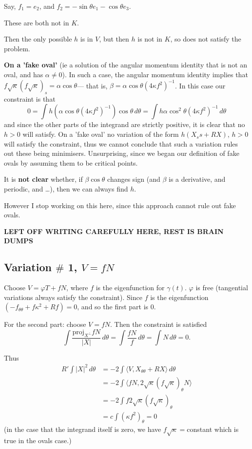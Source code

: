 \documentclass[12pt, a4paper]{amsart}
\theoremstyle{remark}
\begin{document}
Say, 
$f_1= e_2$, and 
$f_2=-\sin\theta e_1 -\cos\theta e_3$.

These are both not in $K$.     

Then the only possible $h$ is in $V$, but then $h$ is not in $K$, so does not satisfy the problem.

\textbf{On a 'fake oval'} (ie a solution of the angular momentum identity that is not an oval, and has $\alpha\not= 0$).    In such a case, the angular momentum identity implies that $f\sqrt\kappa(f\sqrt\kappa)_s=\alpha \cos\theta$--- that is, $\beta=\alpha\cos\theta(4\kappa f^2)^{-1}$.   In this case our constraint is that 
$$0=\int h \left(  \alpha\cos\theta(4\kappa f^2)^{-1}\right)\cos\theta \,d\theta= \int h  \alpha \cos^2\theta(4\kappa f^2)^{-1}\,d\theta $$
and since the other parts of the integrand are strictly positive, it is clear that no $h>0$ will satisfy.      On a 'fake oval' no variation of the form $h(X_ss +RX)$, $h>0$ will satisfy the constraint, thus we cannot conclude that such a variation rules out these being minimisers.      Unsurprising, since we began our definition of fake ovals by assuming them to be critical points.



 It is \textbf{not clear} whether, if $\beta\cos\theta$ changes sign (and $\beta$ is a derivative, and periodic, and \dots), then we can always find $h$.   
 
 However I stop working on this here, since this approach cannot rule out fake ovals.
 
 
 
 
 
  \textbf{LEFT OFF WRITING CAREFULLY HERE, REST IS BRAIN DUMPS}
  
 
  
\subsection*{ Variation $\#$ 1, $V=fN$}
Choose $V=\varphi T + f N$, where $f$ is the eigenfunction for $\gamma(t)$.   $\varphi$ is free (tangential variations always satisfy the constraint).   Since $f$ is the eigenfunction 
$(-f_{\theta\theta}+ f\kappa^2+ Rf)=0$, and so the first part is 0.

For the second part:  choose $V=fN$.  Then the constraint is satisfied
$$\int \frac{         \text{proj}_{X^\perp} 
 fN}{|X|}\,d\theta=\int \frac{ fN}{f}\,d\theta=\int N \,d\theta=0 .$$

Thus 
\begin{align*}
 R' \int |X|^2\,d\theta &=-2\int \langle V,X_{\theta\theta}+ R X\rangle \,d\theta
 \\&
 =   -2\int \langle   fN, 2\sqrt{\kappa}(f\sqrt{\kappa})_\theta  N \rangle  \\&
=  -2\int  f 2\sqrt{\kappa}(f\sqrt{\kappa})_\theta   \\&
=c\int (\kappa f^2)_\theta =0
\end{align*}
(in the case that the integrand itself is zero, we have $f\sqrt{\kappa}=$constant which is true in the ovals case.)
\end{document}
